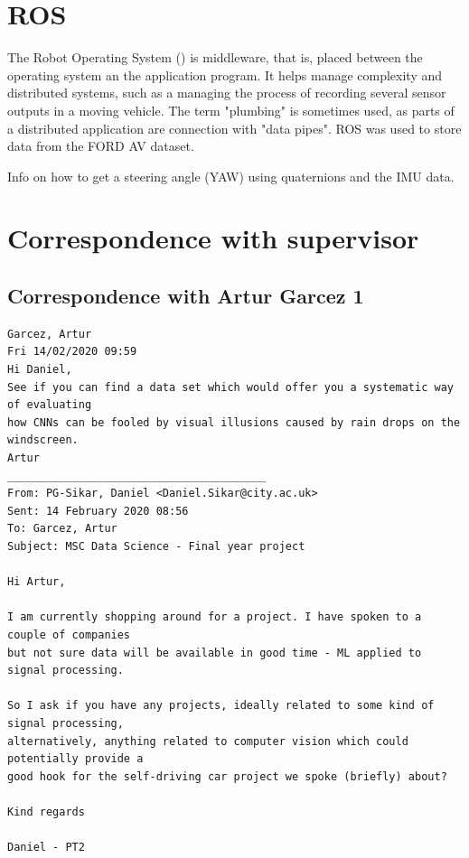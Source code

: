 \section{ROS}
The Robot Operating System (\cite{quigley2009ros}) is middleware, that is, placed between the operating system an the application program. It helps manage complexity and distributed systems, such as a managing the process of recording several sensor outputs in a moving vehicle. The term "plumbing" is sometimes used, as parts of a distributed application are connection with "data pipes".  
ROS was used to store data from the FORD AV dataset.

Info on how to get a steering angle (YAW) using quaternions and the IMU data.

\section{Correspondence with supervisor}
\label{corr_with_super}
\subsection{Correspondence with Artur Garcez 1}
\begin{verbatim}
Garcez, Artur
Fri 14/02/2020 09:59
Hi Daniel,
See if you can find a data set which would offer you a systematic way of evaluating
how CNNs can be fooled by visual illusions caused by rain drops on the windscreen.
Artur
________________________________________
From: PG-Sikar, Daniel <Daniel.Sikar@city.ac.uk>
Sent: 14 February 2020 08:56
To: Garcez, Artur
Subject: MSC Data Science - Final year project

Hi Artur,

I am currently shopping around for a project. I have spoken to a couple of companies
but not sure data will be available in good time - ML applied to signal processing.

So I ask if you have any projects, ideally related to some kind of signal processing,
alternatively, anything related to computer vision which could potentially provide a
good hook for the self-driving car project we spoke (briefly) about?

Kind regards

Daniel - PT2    
\end{verbatim}

